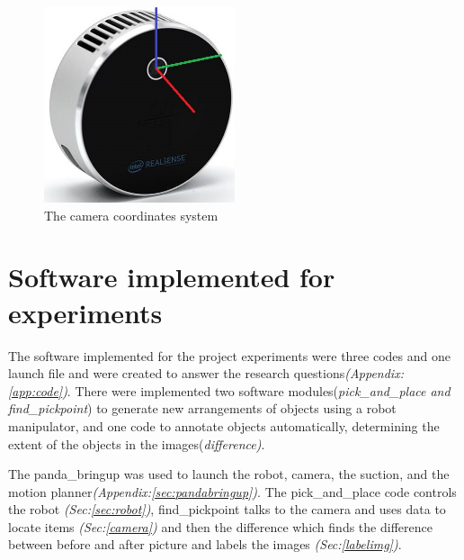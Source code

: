\begin{figure}[h]
 \centering
 \includegraphics[width=0.5\textwidth]{graphics/lidar515.jpg}
 \caption{The camera coordinates system\cite{noauthor_intel_nodate}}
 \label{fig:l515cor}
\end{figure}
\clearpage

\section{Software implemented for experiments}
The software implemented for the project experiments were three codes and one launch file and were created to answer the research questions\textit{(Appendix: \ref{app:code})}. There were implemented two software modules(\textit{pick\_and\_place and find\_pickpoint}) to generate new arrangements of objects using a robot manipulator, and one code to annotate objects automatically, determining the extent of the objects in the images(\textit{difference)}.

The panda\_bringup was used to launch the robot, camera, the suction, and the motion planner\textit{(Appendix:\ref{sec:pandabringup})}. 
The pick\_and\_place code controls the robot \textit{(Sec:\ref{sec:robot})}, 
find\_pickpoint talks to the camera and uses data to locate items \textit{(Sec:\ref{camera})} and then the difference which finds the difference between before and after picture and labels the images \textit{(Sec:\ref{labelimg})}.


